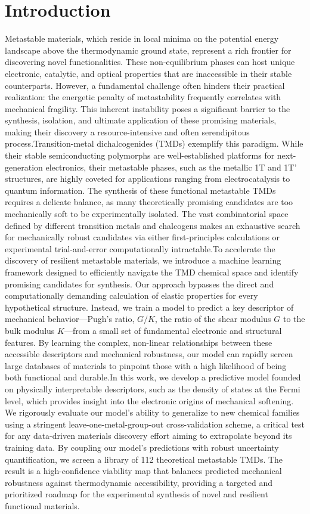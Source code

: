 \documentclass[]{article}
\begin{document}
\section{Introduction}
\label{sec:intro}
Metastable materials, which reside in local minima on the potential energy landscape above the thermodynamic ground state, represent a rich frontier for discovering novel functionalities. These non-equilibrium phases can host unique electronic, catalytic, and optical properties that are inaccessible in their stable counterparts. However, a fundamental challenge often hinders their practical realization: the energetic penalty of metastability frequently correlates with mechanical fragility. This inherent instability poses a significant barrier to the synthesis, isolation, and ultimate application of these promising materials, making their discovery a resource-intensive and often serendipitous process.Transition-metal dichalcogenides (TMDs) exemplify this paradigm. While their stable semiconducting polymorphs are well-established platforms for next-generation electronics, their metastable phases, such as the metallic 1T and 1T' structures, are highly coveted for applications ranging from electrocatalysis to quantum information. The synthesis of these functional metastable TMDs requires a delicate balance, as many theoretically promising candidates are too mechanically soft to be experimentally isolated. The vast combinatorial space defined by different transition metals and chalcogens makes an exhaustive search for mechanically robust candidates via either first-principles calculations or experimental trial-and-error computationally intractable.To accelerate the discovery of resilient metastable materials, we introduce a machine learning framework designed to efficiently navigate the TMD chemical space and identify promising candidates for synthesis. Our approach bypasses the direct and computationally demanding calculation of elastic properties for every hypothetical structure. Instead, we train a model to predict a key descriptor of mechanical behavior—Pugh's ratio, $G/K$, the ratio of the shear modulus $G$ to the bulk modulus $K$—from a small set of fundamental electronic and structural features. By learning the complex, non-linear relationships between these accessible descriptors and mechanical robustness, our model can rapidly screen large databases of materials to pinpoint those with a high likelihood of being both functional and durable.In this work, we develop a predictive model founded on physically interpretable descriptors, such as the density of states at the Fermi level, which provides insight into the electronic origins of mechanical softening. We rigorously evaluate our model's ability to generalize to new chemical families using a stringent leave-one-metal-group-out cross-validation scheme, a critical test for any data-driven materials discovery effort aiming to extrapolate beyond its training data. By coupling our model's predictions with robust uncertainty quantification, we screen a library of 112 theoretical metastable TMDs. The result is a high-confidence viability map that balances predicted mechanical robustness against thermodynamic accessibility, providing a targeted and prioritized roadmap for the experimental synthesis of novel and resilient functional materials.
\end{document}
